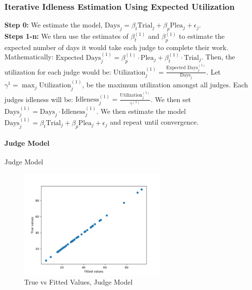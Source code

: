 \documentclass[11pt, oneside]{article}   	%
\theoremstyle{ModifiedStyle}
\begin{document}
	  \subsubsection{Iterative Idleness Estimation Using Expected Utilization}
			\textbf{Step 0:} We estimate the model, $\text{Days}_j = \beta_t\text{Trial}_j + \beta_p\text{Plea}_j +\epsilon_j$. \\

			\noindent \textbf{Steps 1-n:} We then use the estimates of $\beta^{(1)}_t$ and $\beta^{(1)}_p$ to estimate the expected number
			of days it would take each judge to complete their work. Mathematically: $\text{Expected Days}^{(1)}_j = \beta^{(1)}_p \cdot \text{Plea}_j + \beta^{(1)}_t \cdot \text{Trial}_j$. Then, the utilization for each judge would be: $\text{Utilization}^{(1)}_j = \frac{\text{Expected Days}^{(1)}_j}{\text{Days}_j}$. Let $\gamma^1 = \max_j \text{Utilization}^{(1)}_j$, be the maximum utilization amongst all judges. Each judges idleness will be: $\text{Idleness}^{(1)}_j = \frac{\text{Utilization}^{(1)}_j}{\gamma^{(1)}}$. We then set $\text{Days}^{(1)}_j = \text{Days}_j \cdot \text{Idleness}^{(1)}_j$. We then estimate the model $\text{Days}^{(1)}_j = \beta_t\text{Trial}_j + \beta_p\text{Plea}_j +\epsilon_j$ and repeat until convergence.

			\paragraph{Judge Model}

				\begin{table}[H]
					\centering
					\caption{Judge Model}
					
				\end{table}

				\begin{figure}[H]
					\centering
					\includegraphics[width=0.65\textwidth]{../../output/figures/Exploration/fit_utilization_JudgeID}
					\caption{True vs Fitted Values, Judge Model}
				\end{figure}
\end{document}
